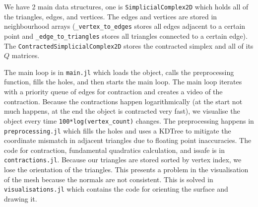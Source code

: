 \documentclass{ijclclp}
\begin{document}
We have 2 main data structures, one is \texttt{SimplicialComplex2D} which holds all of the triangles, edges, and vertices. The edges and vertices are stored in neighbourhood arrays (\texttt{\_vertex\_to\_edges} stores all edges adjacent to a certain point and \texttt{\_edge\_to\_triangles} stores all triangles connected to a certain edge). The \texttt{ContractedSimplicialComplex2D} stores the contracted simplex and all of its $Q$ matrices.

The main loop is in \texttt{main.jl} which loads the object, calls the preprocessing function, fills the holes, and then starts the main loop. The main loop iterates with a priority queue of edges for contraction and creates a video of the contraction. Because the contractions happen logarithmically (at the start not much happens, at the end the object is contracted very fast), we visualise the object every time \texttt{100*log(vertex\_count)} changes.
The preprocessing happens in \texttt{preprocessing.jl} which fills the holes and uses a KDTree to mitigate the  coordinate mismatch in adjacent triangles due to floating point inaccuracies. The code for contraction, fundamental quadratics calculation, and issafe is in \texttt{contractions.jl}. Because our triangles are stored sorted by vertex index, we lose the orientation of the triangles. This presents a problem in the visualisation of the mesh because the normals are not consistent. This is solved in \texttt{visualisations.jl} which contains the code for orienting the surface and drawing it.
\newpage
\end{document}
